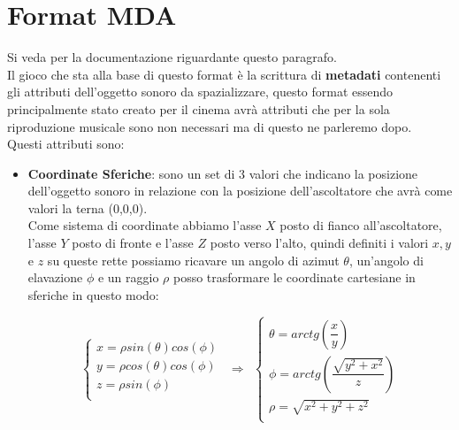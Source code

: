 \documentclass[12pt,a4paper]{report}
\begin{document}
\section{Format MDA}

Si veda \cite{mda} per la documentazione riguardante questo paragrafo.\\

Il gioco che sta alla base di questo format è la scrittura di \textbf{metadati} contenenti gli attributi dell'oggetto sonoro da spazializzare, questo format essendo principalmente stato creato per il cinema avrà attributi che per la sola riproduzione musicale sono non necessari ma di questo ne parleremo dopo.\\

Questi attributi sono:
\begin{itemize}\label{aaa}
\item \textbf{Coordinate Sferiche}: sono un set di 3 valori che indicano la posizione dell'oggetto sonoro in relazione con la posizione dell'ascoltatore che avrà come valori la terna (0,0,0).\\

Come sistema di coordinate abbiamo l'asse $X$ posto di fianco all'ascoltatore, l'asse $Y$ posto di fronte e l'asse $Z$ posto verso l'alto, quindi definiti i valori $x,y$ e $z$ su queste rette possiamo ricavare un angolo di azimut $\theta$, un'angolo di elavazione $\phi$ e un raggio $\rho$
posso trasformare le coordinate cartesiane in sferiche in questo modo:

\begin{equation}
	\left\{\begin{matrix}
x= \rho sin(\theta) cos(\phi) \\
y= \rho cos(\theta) cos(\phi)\\
z= \rho sin(\phi)\\
\end{matrix}\right. \ \ \Rightarrow \ \  \left\{\begin{matrix}
\theta = arctg \left(\dfrac{x}{y} \right) \\
\phi   = arctg \left(\dfrac{\sqrt{y^2 + x^2 }}{z} \right) \\
\rho = \sqrt{x^2 +y^2 +z^2 }\\
\end{matrix}\right.
	\label{eq:coordinatepolari}
\end{equation}


\end{itemize}
\end{document}
